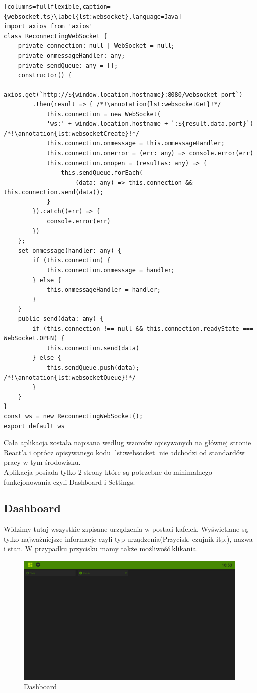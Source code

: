 \begin{lstlisting}[columns=fullflexible,caption={websocket.ts}\label{lst:websocket},language=Java]
import axios from 'axios'
class ReconnectingWebSocket {
    private connection: null | WebSocket = null;
    private onmessageHandler: any;
    private sendQueue: any = [];
    constructor() {
        axios.get(`http://${window.location.hostname}:8080/websocket_port`)
        .then(result => { /*!\annotation{lst:websocketGet}!*/
            this.connection = new WebSocket(
            'ws:' + window.location.hostname + `:${result.data.port}`) /*!\annotation{lst:websocketCreate}!*/
            this.connection.onmessage = this.onmessageHandler;
            this.connection.onerror = (err: any) => console.error(err)
            this.connection.onopen = (resultws: any) => {
                this.sendQueue.forEach(
                    (data: any) => this.connection && this.connection.send(data));
            }
        }).catch((err) => {
            console.error(err)
        })
    };
    set onmessage(handler: any) {
        if (this.connection) {
            this.connection.onmessage = handler;
        } else {
            this.onmessageHandler = handler;
        }
    }
    public send(data: any) {
        if (this.connection !== null && this.connection.readyState === WebSocket.OPEN) {
            this.connection.send(data)
        } else {
            this.sendQueue.push(data); /*!\annotation{lst:websocketQueue}!*/
        }
    }
}
const ws = new ReconnectingWebSocket();
export default ws
\end{lstlisting} \newpage
\par Cała aplikacja została napisana według wzorców opisywanych na głównej stronie React'a i oprócz opisywanego kodu \ref{lst:websocket} nie odchodzi od standardów pracy w tym środowisku. \cite{React}\\
Aplikacja posiada tylko 2 strony które są potrzebne do minimalnego funkcjonowania czyli Dashboard i Settings.
\subsection{Dashboard}
Widzimy tutaj wszystkie zapisane urządzenia w postaci kafelek. Wyświetlane są tylko najważniejsze informacje czyli typ urządzenia(Przycisk, czujnik itp.), nazwa i stan. W przypadku przycisku mamy także możliwość klikania. 
\begin{figure}[h]
  \includegraphics[width=\linewidth]{dashboard.png}
  \caption{Dashboard}
  \label{fig:dashboard}
\end{figure}
\newpage

